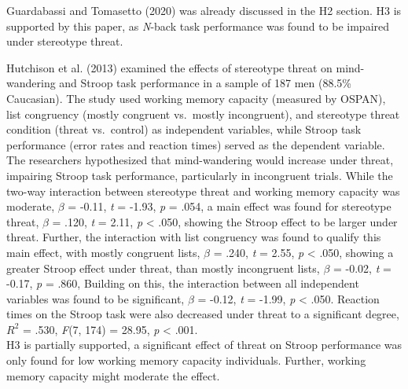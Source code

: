 \documentclass[
  stu, a4paper,floatsintext]{apa7}
\begin{document}
Guardabassi and Tomasetto (2020) was already discussed in the H2 section.
H3 is supported by this paper, as \emph{N}-back task performance was found to be impaired under stereotype threat.

Hutchison et al. (2013) examined the effects of stereotype threat on mind-wandering and Stroop task performance in a sample of 187 men (88.5\% Caucasian). The study used working memory capacity (measured by OSPAN), list congruency (mostly congruent vs.~mostly incongruent), and stereotype threat condition (threat vs.~control) as independent variables, while Stroop task performance (error rates and reaction times) served as the dependent variable. The researchers hypothesized that mind-wandering would increase under threat, impairing Stroop task performance, particularly in incongruent trials.
While the two-way interaction between stereotype threat and working memory capacity was moderate, \(\beta\) = -0.11, \emph{t} = -1.93, \emph{p} = .054, a main effect was found for stereotype threat, \(\beta\) = .120, \emph{t} = 2.11, \emph{p} \textless{} .050, showing the Stroop effect to be larger under threat.
Further, the interaction with list congruency was found to qualify this main effect, with mostly congruent lists, \(\beta\) = .240, \emph{t} = 2.55, \emph{p} \textless{} .050, showing a greater Stroop effect under threat, than mostly incongruent lists, \(\beta\) = -0.02, \emph{t} = -0.17, \emph{p} = .860,
Building on this, the interaction between all independent variables was found to be significant, \(\beta\) = -0.12, \emph{t} = -1.99, \emph{p} \textless{} .050.
Reaction times on the Stroop task were also decreased under threat to a significant degree, \(R^2\) = .530, \emph{F}(7, 174) = 28.95, \emph{p} \textless{} .001.\\
H3 is partially supported, a significant effect of threat on Stroop performance was only found for low working memory capacity individuals.
Further, working memory capacity might moderate the effect.
\end{document}
